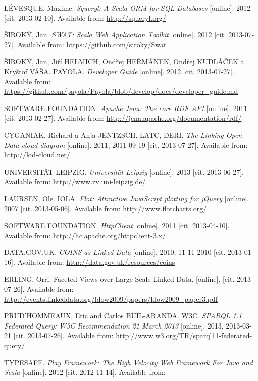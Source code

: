 \begin{thebibliography}{99}
{\sc LÉVESQUE,} Maxime. 
\emph{Squeryl: A Scala ORM for SQL Databases} [online]. 2012 [cit. 2013-02-10].
Available from: \url{http://squeryl.org/}

{\sc ŠIROKÝ,} Jan. 
\emph{SWAT: Scala Web Application Toolkit} [online]. 2012 [cit. 2013-07-27].
Available from: \url{https://github.com/siroky/Swat}

{\sc ŠIROKÝ,} Jan, Jiří HELMICH, Ondřej HEŘMÁNEK, Ondřej KUDLÁČEK a Kryštof VÁŠA. PAYOLA.
\emph{Developer Guide} [online]. 2012 [cit. 2013-07-27]. 
Available from: \url{https://github.com/payola/Payola/blob/develop/docs/developer_guide.md}

{\scAPACHE SOFTWARE FOUNDATION.} 
\emph{Apache Jena: The core RDF API} [online]. 2011 [cit. 2013-02-27]. 
Available from: \url{http://jena.apache.org/documentation/rdf/}

{\sc CYGANIAK,} Richard a Anja JENTZSCH. LATC, DERI.
\emph{The Linking Open Data cloud diagram} [online]. 2011, 2011-09-19 [cit. 2013-07-27].
Available from: \url{http://lod-cloud.net/}

{\sc UNIVERSITÄT LEIPZIG.} \emph{Universität Leipzig} [online]. 2013 [cit. 2013-06-27].
Available from: \url{http://www.zv.uni-leipzig.de/}

{\sc LAURSEN,} Ole. IOLA. 
\emph{Flot: Attractive JavaScript plotting for jQuery} [online]. 2007 [cit. 2013-05-06].
Available from: \url{http://www.flotcharts.org/}

{\scAPACHE SOFTWARE FOUNDATION.}
\emph{HttpClient} [online]. 2011 [cit. 2013-04-10]. 
Available from: \url{http://hc.apache.org/httpclient-3.x/}

{\sc DATA.GOV.UK.}
\emph{COINS as Linked Data} [online]. 2010, 11-11-2010 [cit. 2013-01-16].
Available from: \url{http://data.gov.uk/resources/coins}

{\sc ERLING,} Orri.
Faceted Views over Large-Scale Linked Data.  [online]. [cit. 2013-07-26].
Available from: \url{http://events.linkeddata.org/ldow2009/papers/ldow2009_paper3.pdf}

{\sc PRUD'HOMMEAUX,} Eric and Carlos BUIL-ARANDA. W3C.
\emph{SPARQL 1.1 Federated Query: W3C Recommendation 21 March 2013} [online].
2013, 2013-03-21 [cit. 2013-07-26].
Available from: \url{http://www.w3.org/TR/sparql11-federated-query/}

{\sc TYPESAFE.}
\emph{Play Framework: The High Velocity Web Framework For Java and Scala} [online].
2012 [cit. 2012-11-14]. 
Available from: 

\end{thebibliography}
